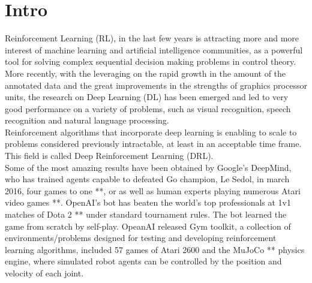 \section{Intro}

\noindent 

Reinforcement Learning (RL), in the last few years is attracting more and more interest of machine learning and artificial intelligence communities, as a powerful tool for solving complex sequential decision making problems in control theory.
\\More recently, with the leveraging on the rapid growth in the amount of the annotated data and the great improvements in the strengths of graphics processor units, the research on  Deep Learning (DL) has been emerged and led to very good performance on a variety of problems, such as visual recognition, speech recognition and natural language processing.
\\Reinforcement algorithms that incorporate deep learning is enabling to scale to problems considered previously intractable, at least in an acceptable time frame. This field is called Deep Reinforcement Learning (DRL).
\\Some of the most amazing results have been obtained by Google’s DeepMind, who has trained agents capable to defeated Go champion, Le Sedol, in march 2016, four games to one **, or as well as human experts playing numerous Atari video games **.
OpenAI’s bot has beaten the world’s top professionals at 1v1 matches of Dota 2 ** under standard tournament rules. The bot learned the game from scratch by self-play.
OpeanAI released Gym toolkit, a collection of environments/problems designed for testing and developing reinforcement learning algorithms, included 57 games of Atari 2600 and the MuJoCo ** physics engine, where simulated robot agents can be controlled by the position and velocity of each joint. 
